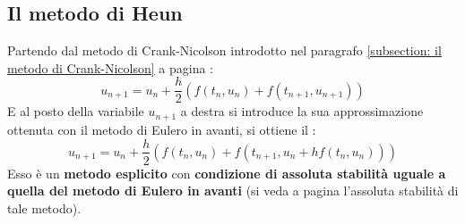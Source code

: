 \subsection{Il metodo di Heun}

Partendo dal metodo di Crank-Nicolson introdotto nel paragrafo \ref{subsection: il metodo di Crank-Nicolson} a pagina \pageref{subsection: il metodo di Crank-Nicolson}:
\begin{equation*}
	u_{n+1} = u_{n} + \dfrac{h}{2}\left(f\left(t_{n}, u_{n}\right) + f\left(t_{n+1}, u_{n+1}\right)\right)
\end{equation*}
E al posto della variabile $u_{n+1}$ a destra si introduce la sua approssimazione ottenuta con il metodo di Eulero in avanti, si ottiene il :
\begin{equation}
	u_{n+1} = u_{n} + \dfrac{h}{2}\left(f\left(t_{n}, u_{n}\right) + f\left(t_{n+1}, u_{n} + hf\left(t_{n}, u_{n}\right)\right)\right)
\end{equation}
Esso è un \textbf{metodo esplicito} con \textbf{condizione di assoluta stabilità uguale a quella del metodo di Eulero in avanti} (si veda a pagina \pageref{Assoluta stabilità: metodo di Eulero in avanti} l'assoluta stabilità di tale metodo).